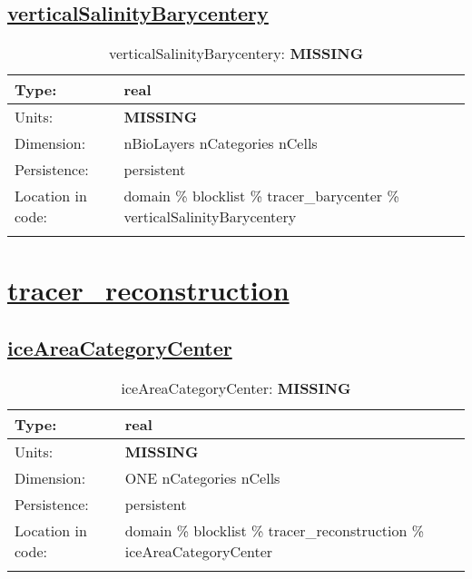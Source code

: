\subsection[verticalSalinityBarycentery]{\hyperref[sec:var_tab_tracer_barycenter]{verticalSalinityBarycentery}}
\label{subsec:var_sec_tracer_barycenter_verticalSalinityBarycentery}
\begin{center}
\begin{longtable}{| p{2.0in} | p{4.0in} |}
        \hline 
        Type: & real \\
        \hline 
        Units: & {\bf \color{red} MISSING} \\
        \hline 
        Dimension: & nBioLayers nCategories nCells \\
        \hline 
        Persistence: & persistent \\
        \hline 
         Location in code: & domain \% blocklist \% tracer\_barycenter \% verticalSalinityBarycentery \\
         \hline 
    \caption{verticalSalinityBarycentery: {\bf \color{red} MISSING}}
\end{longtable}
\end{center}
\section[tracer\_reconstruction]{\hyperref[sec:var_tab_tracer_reconstruction]{tracer\_reconstruction}}
\label{sec:var_sec_tracer_reconstruction}
\subsection[iceAreaCategoryCenter]{\hyperref[sec:var_tab_tracer_reconstruction]{iceAreaCategoryCenter}}
\label{subsec:var_sec_tracer_reconstruction_iceAreaCategoryCenter}
\begin{center}
\begin{longtable}{| p{2.0in} | p{4.0in} |}
        \hline 
        Type: & real \\
        \hline 
        Units: & {\bf \color{red} MISSING} \\
        \hline 
        Dimension: & ONE nCategories nCells \\
        \hline 
        Persistence: & persistent \\
        \hline 
         Location in code: & domain \% blocklist \% tracer\_reconstruction \% iceAreaCategoryCenter \\
         \hline 
    \caption{iceAreaCategoryCenter: {\bf \color{red} MISSING}}
\end{longtable}
\end{center}
